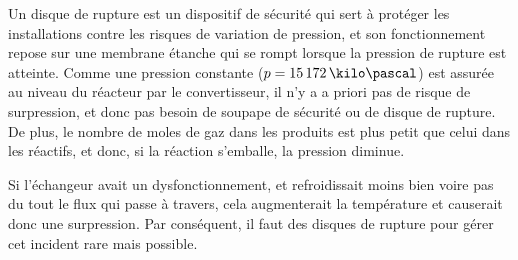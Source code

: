 Un disque de rupture est un dispositif de sécurité qui sert à protéger les installations contre les risques de variation de pression, et son fonctionnement repose sur une membrane étanche qui se rompt lorsque la pression de rupture est atteinte. \cite{disque}
Comme une pression constante ($p=15\,172\,\kilo\pascal$) est assurée au niveau du réacteur par le convertisseur, il n'y a a priori pas de risque de surpression, et donc pas besoin de soupape de sécurité ou de disque de rupture.
De plus, le nombre de moles de gaz dans les produits est plus petit que celui dans les réactifs, et donc, si la réaction s'emballe, la pression diminue.

Si l'échangeur avait un dysfonctionnement,
et refroidissait moins bien voire pas du tout le flux qui passe à travers,
cela augmenterait la température et causerait donc une surpression.
Par conséquent, il faut des disques de rupture pour gérer cet incident
rare mais possible.
